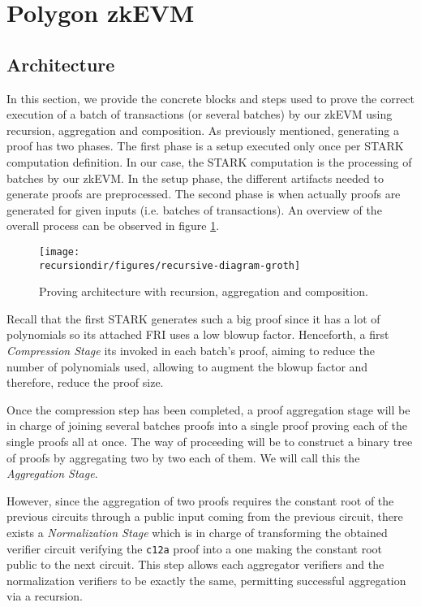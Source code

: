 

\section{Polygon zkEVM \label{section:polygon:zkevm}}

\subsection{Architecture \label{subsec:zkEVM:architecture}}

In this section, we provide the concrete blocks and steps used to
prove the correct execution of a batch of transactions (or several batches)
by our zkEVM using recursion, aggregation and composition.
As previously mentioned, generating a proof has two phases. 
The first phase is a setup executed only once per STARK computation definition. 
In our case, the STARK computation is the processing of batches by our zkEVM.  
In the setup phase, the different artifacts needed to generate proofs are preprocessed.
The second phase is when actually proofs are generated for given inputs (i.e. batches of transactions).
An overview of the overall process can be observed in figure \ref{fig:architecture-aggregation-recursion-composition}.

\begin{figure}[H]
\centering
\texttt{[image: \\recursiondir/figures/recursive-diagram-groth]}
\caption{Proving architecture with recursion, aggregation and composition.}
\label{fig:architecture-aggregation-recursion-composition}
\end{figure}

Recall that the first STARK generates such a big proof since it has a lot of polynomials so its attached FRI uses a low blowup factor. Henceforth, a first \textit{Compression Stage} its invoked in each batch's proof, aiming to reduce the number of polynomials used, allowing to augment the blowup factor and therefore, reduce the proof size.  

Once the compression step has been completed, a proof aggregation stage will be in charge of joining several batches proofs into a single proof proving each of the single proofs all at once. The way of proceeding will be to construct a binary tree of proofs by aggregating two by two each of them. We will call this the \textit{Aggregation Stage}. 


However, since the aggregation of two proofs requires the constant root of the previous circuits through a public input coming from the previous circuit, there exists a \textit{Normalization Stage} which is in charge of transforming the obtained verifier circuit verifying the \texttt{c12a} proof into a one making the constant root public to the next circuit. This step allows each aggregator verifiers and the normalization verifiers to be exactly the same, permitting successful aggregation via a recursion. 

